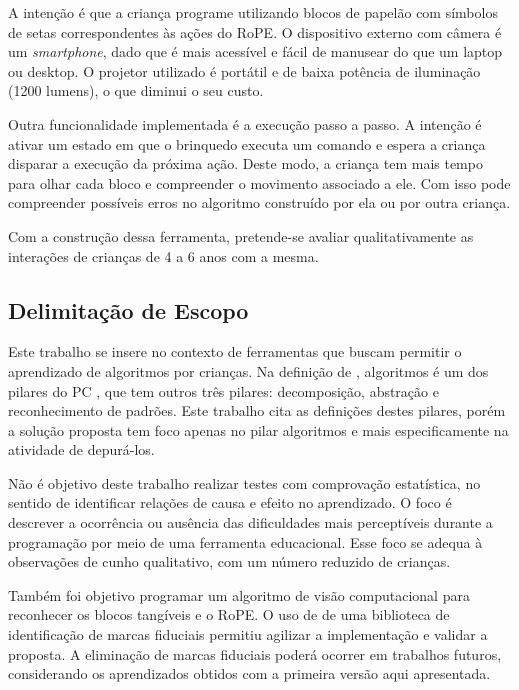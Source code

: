 A intenção é que a criança programe utilizando blocos de papelão com símbolos de setas correspondentes às ações do RoPE. O dispositivo externo com câmera é um \textit{smartphone}, dado que é mais acessível e fácil de manusear do que um laptop ou desktop. O projetor utilizado é portátil e de baixa potência de iluminação (1200 lumens), o que diminui o seu custo.

Outra funcionalidade implementada é a execução passo a passo. A intenção é ativar um estado em que o brinquedo executa um comando e espera a criança disparar a execução da próxima ação. Deste modo, a criança tem mais tempo para olhar cada bloco e compreender o movimento associado a ele. Com isso pode compreender possíveis erros no algoritmo construído por ela ou por outra criança.

Com a construção dessa ferramenta, pretende-se avaliar qualitativamente as interações de crianças de 4 a 6 anos com a mesma. 

\subsection{Delimitação de Escopo}
\label{ss_cintro_escopo}

Este trabalho se insere no contexto de ferramentas que buscam permitir o aprendizado de algoritmos por crianças. Na definição de , algoritmos é um dos pilares do \acl{PC} \cite{brackmann_desenvolvimento_2017}, que tem outros três pilares: decomposição, abstração e reconhecimento de padrões. Este trabalho cita as definições destes pilares, porém a solução proposta tem foco apenas no pilar algoritmos e mais especificamente na atividade de depurá-los.

Não é objetivo deste trabalho realizar testes com comprovação estatística, no sentido de identificar relações de causa e efeito no aprendizado. O foco é descrever a ocorrência ou ausência das dificuldades mais perceptíveis durante a programação por meio de uma ferramenta educacional. Esse foco se adequa à observações de cunho qualitativo, com um número reduzido de crianças.

Também foi objetivo programar um algoritmo de visão computacional para reconhecer os blocos tangíveis e o RoPE. O uso de de uma biblioteca de identificação de marcas fiduciais permitiu agilizar a implementação e validar a proposta. A eliminação de marcas fiduciais poderá ocorrer em trabalhos futuros, considerando os aprendizados obtidos com a primeira versão aqui apresentada.

